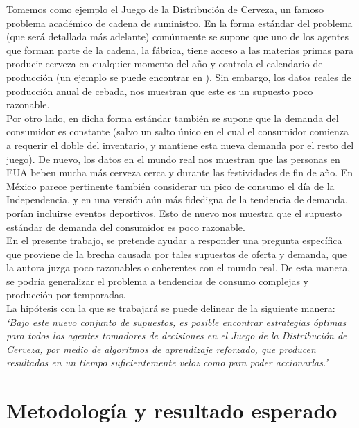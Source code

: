 Tomemos como ejemplo el Juego de la Distribuci\'on de Cerveza, un famoso problema acad\'emico de cadena de suministro. En la forma est\'andar del problema (que ser\'a detallada m\'as adelante) com\'unmente se supone que uno de los agentes que forman parte de la cadena, la f\'abrica, tiene acceso a las materias primas para producir cerveza en cualquier momento del a\~no y controla el calendario de producci\'on (un ejemplo se puede encontrar en \citet{Sterman}). Sin embargo, los datos reales de producci\'on anual de cebada, nos muestran que este es un supuesto poco razonable.\\

Por otro lado, en dicha forma est\'andar tambi\'en se supone que la demanda del consumidor es constante (salvo un salto \'unico en el cual el consumidor comienza a requerir el doble del inventario, y mantiene esta nueva demanda por el resto del juego). De nuevo, los datos en el mundo real nos muestran que las personas en EUA beben mucha m\'as cerveza cerca y durante las festividades de fin de a\~no. En M\'exico parece pertinente tambi\'en considerar un pico de consumo el d\'ia de la Independencia, y en una versi\'on a\'un m\'as fidedigna de la tendencia de demanda, por\'ian incluirse eventos deportivos. Esto de nuevo nos muestra que el supuesto est\'andar de demanda del consumidor es poco razonable.\\

En el presente trabajo, se pretende ayudar a responder una pregunta espec\'ifica que proviene de la brecha causada por tales supuestos de oferta y demanda, que la autora juzga poco razonables o coherentes con el mundo real. De esta manera, se podr\'ia generalizar el problema a tendencias de consumo complejas y producci\'on por temporadas.\\

La hip\'otesis con la que se trabajar\'a se puede delinear de la siguiente manera:\\

\textit{`Bajo este nuevo conjunto de supuestos, es posible encontrar estrategias \'optimas para todos los agentes tomadores de decisiones en el Juego de la Distribuci\'on de Cerveza, por medio de algoritmos de aprendizaje reforzado, que producen resultados en un tiempo suficientemente veloz como para poder accionarlas.'}\\

\section{Metodolog\'ia y resultado esperado}

